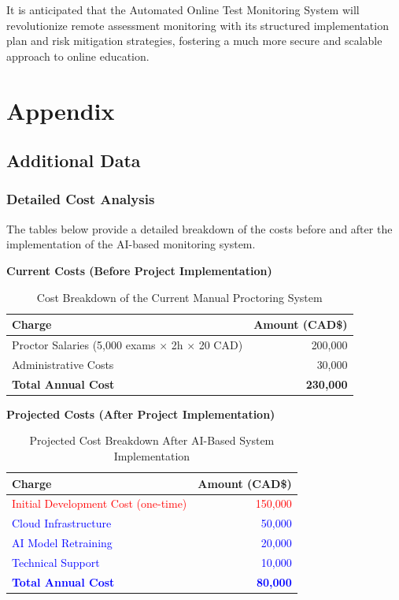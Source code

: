 \documentclass[12pt,a4paper]{article}
\begin{document}
It is anticipated that the Automated Online Test Monitoring System will revolutionize remote assessment monitoring with its structured implementation plan and risk mitigation strategies, fostering a much more secure and scalable approach to online education.

\appendix
\section{Appendix}

\subsection{Additional Data}

\subsubsection{Detailed Cost Analysis}
\label{sec:cost_analysis}

The tables below provide a detailed breakdown of the costs before and after the implementation of the AI-based monitoring system.

\textbf{Current Costs (Before Project Implementation)}
\begin{table}[H]
    \centering
    \renewcommand{\arraystretch}{1.3}
    \begin{tabular}{|l|r|}
        \hline
        \textbf{Charge} & \textbf{Amount (CAD\$)} \\
        \hline
        Proctor Salaries (5,000 exams $\times$ 2h $\times$ 20 CAD) & 200,000 \\
        Administrative Costs & 30,000 \\
        \hline
        \textbf{Total Annual Cost} & \textbf{230,000} \\
        \hline
    \end{tabular}
    \caption{Cost Breakdown of the Current Manual Proctoring System}
\end{table}

\textbf{Projected Costs (After Project Implementation)}
\begin{table}[H]
    \centering
    \renewcommand{\arraystretch}{1.3}
    \begin{tabular}{|l|r|}
        \hline
        \textbf{Charge} & \textbf{Amount (CAD\$)} \\
        \hline
        \textcolor{red}{Initial Development Cost (one-time)} & \textcolor{red}{150,000} \\
        \textcolor{blue}{Cloud Infrastructure} & \textcolor{blue}{50,000} \\
        \textcolor{blue}{AI Model Retraining} & \textcolor{blue}{20,000} \\
        \textcolor{blue}{Technical Support} & \textcolor{blue}{10,000} \\
        \hline
        \textcolor{blue}{\textbf{Total Annual Cost}} & \textcolor{blue}{\textbf{80,000}} \\
        \hline
    \end{tabular}
    \caption{Projected Cost Breakdown After AI-Based System Implementation}
\end{table}
\end{document}
